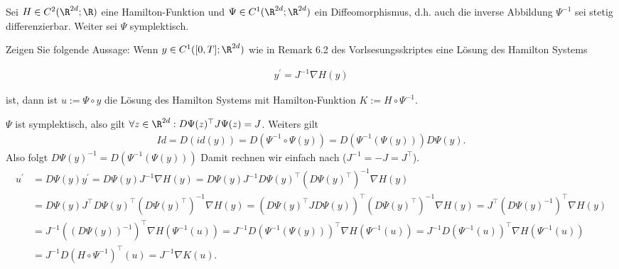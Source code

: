 \begin{exercise}
  Sei $H \in C^2(\R^{2d};\R)$ eine Hamilton-Funktion und
  $\Psi \in C^1(\R^{2d};\R^{2d})$ ein Diffeomorphismus,
  d.h. auch die inverse Abbildung $\Psi^{-1}$ sei stetig
  differenzierbar. Weiter sei $\Psi$ symplektisch.

  Zeigen Sie folgende Aussage: Wenn $y \in C^1([0,T];\R^{2d})$
  wie in Remark 6.2 des Vorlsesungsskriptes eine Lösung des
  Hamilton Systems

  \begin{align}
    y^\prime = J^{-1}\nabla H(y)
  \end{align}

  ist, dann ist $u := \Psi \circ y$ die Lösung des Hamilton
  Systems mit Hamilton-Funktion $K := H \circ \Psi^{-1}$.
\end{exercise}

\begin{solution}
  $\Psi$ ist symplektisch, also gilt $\forall z \in \R^{2d}: D\Psi(z)^{\top}J\Psi(z) = J$.
  Weiters gilt
  \begin{align*}
    Id = D(id(y)) = D(\Psi^{-1} \circ \Psi(y)) = D(\Psi^{-1}(\Psi(y)))D\Psi(y).
  \end{align*}
  Also folgt $D\Psi(y)^{-1} =  D(\Psi^{-1}(\Psi(y)))$
  Damit rechnen wir einfach nach ($J^{-1} = -J = J^{\top}$).
  \begin{align*}
    u^{\prime} &= D \Psi(y)y^{\prime} = D\Psi(y)J^{-1}\nabla H(y) =  D\Psi(y)J^{-1}D\Psi(y)^{\top}(D\Psi(y)^{\top})^{-1}\nabla H(y) \\
    &= D\Psi(y)J^{\top}D\Psi(y)^{\top}(D\Psi(y)^{\top})^{-1}\nabla H(y)
    = (D\Psi(y)^{\top}JD\Psi(y))^{\top}(D\Psi(y)^{\top})^{-1}\nabla H(y)
    = J^{\top}(D\Psi(y)^{-1})^{\top}\nabla H(y) \\
    &= J^{-1}((D\Psi(y))^{-1})^{\top}\nabla H(\Psi^{-1}(u))
    = J^{-1}D(\Psi^{-1}(\Psi(y)))^{\top}\nabla H(\Psi^{-1}(u)) =
    J^{-1}D(\Psi^{-1}(u))^{\top}\nabla H(\Psi^{-1}(u)) \\
    &= J^{-1}D(H \circ \Psi^{-1})^{\top}(u) =  J^{-1}\nabla K(u).
  \end{align*}

\end{solution}
